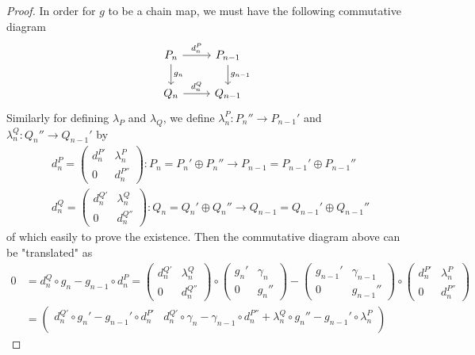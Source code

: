 \begin{proof}
    In order for $g$ to be a chain map, we must have the following commutative diagram
    \[
    \begin{tikzcd}
        P_n \arrow[r, "d_n^P"] \arrow[d, "g_n"] &P_{n-1} \arrow[d, "g_{n-1}"]\\
        Q_n \arrow[r, "d_n^Q"] &Q_{n-1}
    \end{tikzcd}
    \]
    Similarly for defining $\lambda_P$ and $\lambda_Q$, we define $\lambda_n^P: P_n'' \to P_{n-1}'$ and $\lambda_n^Q: Q_n''\to Q_{n-1}'$ by
    \begin{align*}
        &d_n^P= \begin{pmatrix}
            d_n^{P'} &\lambda_n^P\\
            0 &d_n^{P''}
        \end{pmatrix}
        :P_n= P_n'\oplus P_n''\to P_{n-1}= P_{n-1} '\oplus P_{n-1}''\\
        &d_n^Q= \begin{pmatrix}
            d_n^{Q'} &\lambda_n^Q\\
            0 &d_n^{Q''}
        \end{pmatrix}
        :Q_n= Q_n'\oplus Q_n''\to Q_{n-1}= Q_{n-1} '\oplus Q_{n-1}''
    \end{align*}
    of which easily to prove the existence. Then the commutative diagram above can be "translated" as
    \begin{align*}
        0&= d_n^Q\circ g_n-g_{n-1} \circ d_n^{P}= \begin{pmatrix}
            d_n^{Q'} &\lambda^Q_n\\
            0&d_n^{Q''}
        \end{pmatrix}
        \circ \begin{pmatrix}
            g_n' &\gamma_n\\
            0&g_n''
        \end{pmatrix}
        - \begin{pmatrix}
            g_{n-1}' &\gamma_{n-1}\\
            0&g_{n-1}''
        \end{pmatrix}
        \circ \begin{pmatrix}
            d_n^{P'} &\lambda^P_n\\
            0&d_n^{P''}
        \end{pmatrix}
        \\
        &=\begin{pmatrix}
            d_n^{Q'} \circ g_n'- g_{n-1}' \circ d_n^{P'} &d_n^{Q'} \circ \gamma_n- \gamma_{n-1} \circ d_n^{P''}+ \lambda_n^Q\circ g_n''- g_{n-1}' \circ \lambda_n^P\\

\end{pmatrix}
\end{align*}
\end{proof}
